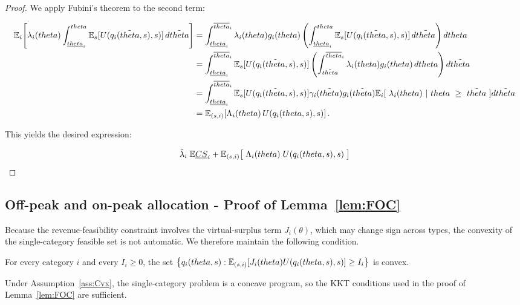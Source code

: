 \documentclass{class}
\begin{document}
\begin{proof}
We apply Fubini's theorem to the second term:

\begin{align*}
\mathbb{E}_i\!\left[\lambda_i(theta)\int_{\underline{theta}_i}^{theta}
\mathbb{E}_s[U(q_i(\tilde{theta},s),s)]\,d\tilde{theta}\right]
&= \int_{\underline{theta}_i}^{\overline{theta}_i} \lambda_i(theta) g_i(theta) 
   \left(\int_{\underline{theta}_i}^{theta} \mathbb{E}_s[U(q_i(\tilde{theta},s),s)]\,d\tilde{theta}\right) dtheta \\
&= \int_{\underline{theta}_i}^{\overline{theta}_i} \mathbb{E}_s[U(q_i(\tilde{theta},s),s)] 
   \left(\int_{\tilde{theta}}^{\overline{theta}_i} \lambda_i(theta) g_i(theta)\,dtheta\right) d\tilde{theta} \\
&= \int_{\underline{theta}_i}^{\overline{theta}_i} \mathbb{E}_s[U(q_i(\tilde{theta},s),s)] 
    \gamma_i(\tilde {theta}) g_i(\tilde {theta}) \mathbb{E}_i[ \ \lambda_i( theta) \ | \ theta \ \ge \ \tilde {theta} \ ] d\tilde{theta} \\
&= \mathbb{E}_{(s,i)}\!\left[\Lambda_i(theta)\, U(q_i(theta,s),s)\right].
\end{align*}

This yields the desired expression:

\[ \tilde{\lambda}_i \;\mathbb{E}\underline{CS}_i 
      + \mathbb{E}_{(s,i)} \big[\; \Lambda_i(theta)\;  U(q_i(theta,s),s)\; \big] \]

\end{proof}


\subsection{Off-peak and on-peak allocation - Proof of Lemma~\ref{lem:FOC}}\label{proof:FOC}

Because the revenue-feasibility constraint involves the virtual-surplus term $J_i(\theta)$, which may change sign across types, the convexity of the single-category feasible set is not automatic. We therefore maintain the following condition.

\begin{assumption}\label{ass:Cvx}
For every category $i$ and every $I_i \ge 0$, the set
$\left\{ q_i(theta,s): \mathbb{E}_{(s,i)}\!\left[J_i(theta)U(q_i(theta,s),s)\right] \ge I_i \right\}$
is convex.
\end{assumption}

Under Assumption~\ref{ass:Cvx}, the single-category problem is a concave program, so the KKT conditions used in the proof of Lemma~\ref{lem:FOC} are sufficient.
\end{document}
